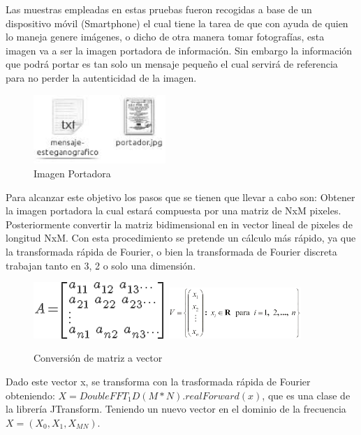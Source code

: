 \documentclass[12pt]{article}
\begin{document}
Las muestras empleadas en estas pruebas fueron recogidas a base de un dispositivo móvil (Smartphone)  el cual tiene la tarea de que con ayuda de quien lo maneja genere imágenes, o dicho de otra manera tomar fotografías, esta imagen va a ser la imagen portadora de información. Sin embargo la información que podrá portar es tan solo un mensaje pequeño el cual servirá de referencia para no perder la autenticidad de la imagen.
\newline
\begin{figure}[hbtp]
\centering
\includegraphics[width = 5cm]{portador.jpeg}
\caption{Imagen Portadora}
\end{figure}
\newline
Para alcanzar este objetivo los pasos que se tienen que llevar a cabo son:
\newline
Obtener la imagen portadora la cual estará compuesta por una matriz de NxM pixeles. Posteriormente convertir la matriz bidimensional en in  vector lineal de pixeles de longitud NxM. Con esta procedimiento se pretende un cálculo más rápido, ya que la transformada rápida de Fourier, o bien la transformada de Fourier discreta trabajan tanto en 3, 2 o solo una dimensión.
\newline
\begin{figure}[hbtp]
\centering
\includegraphics[width = 5cm]{matriz.png}
\includegraphics[width = 5cm]{vector.png}
\caption{Conversión de matriz a vector}
\end{figure}
\newline
Dado este vector x, se transforma con la trasformada rápida de Fourier obteniendo:
$X = DoubleFFT_1D(M*N).realForward(x)$, que es una clase de la librería JTransform. Teniendo un nuevo vector en el dominio de la frecuencia $X = (X_0, X_1, X_{MN})$.
\end{document}
